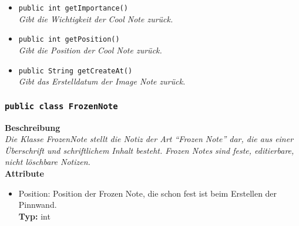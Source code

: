 \begin{itemize}
		\item\texttt{public int getImportance()}\\
		\textit{Gibt die Wichtigkeit der Cool Note zurück.}
		
		\item\texttt{{public int getPosition()}}\\
		\textit{Gibt die Position der Cool Note zurück.}\\
		
		\item\texttt{{public String getCreateAt()}}\\
		\textit{Gibt das Erstelldatum der Image Note zurück.}\\
	\end{itemize}

\subsubsection{\texttt{public class FrozenNote}}

	\textbf{Beschreibung} \\
	\textit{Die Klasse FrozenNote stellt die Notiz der Art “Frozen Note” dar, die aus einer Überschrift und schriftlichem Inhalt besteht. Frozen Notes sind feste, editierbare, nicht löschbare Notizen.} \\
	
	\textbf{Attribute}
	\begin{itemize}
		\item Position: Position der Frozen Note, die schon fest ist beim Erstellen der Pinnwand.\\
		\textbf{Typ:} int
	\end{itemize}
	
